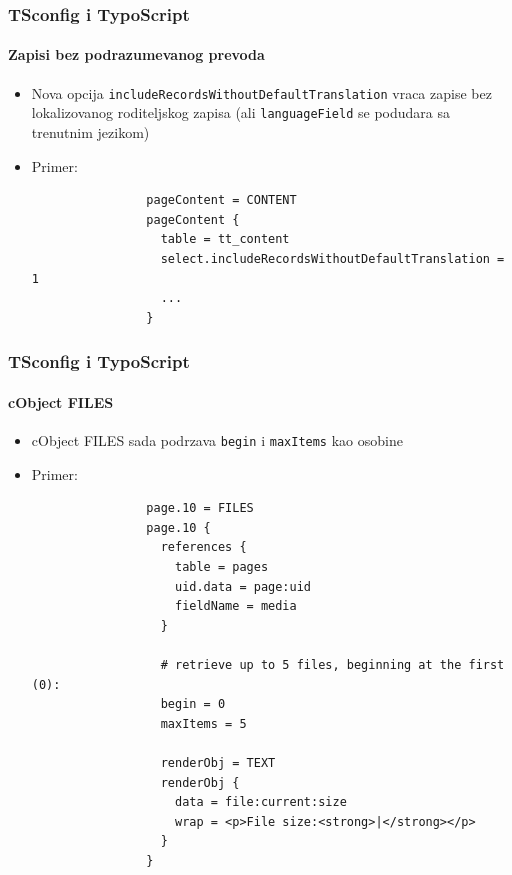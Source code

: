 
\begin{frame}[fragile]
	\frametitle{TSconfig i TypoScript}
	\framesubtitle{Zapisi bez podrazumevanog prevoda}

	\begin{itemize}

		\item Nova opcija \texttt{includeRecordsWithoutDefaultTranslation}
			vraca zapise bez lokalizovanog roditeljskog zapisa\newline
			(ali \texttt{languageField} se podudara sa trenutnim jezikom)

		\item Primer:

			\begin{lstlisting}
				pageContent = CONTENT
				pageContent {
				  table = tt_content
				  select.includeRecordsWithoutDefaultTranslation = 1
				  ...
				}
			\end{lstlisting}

	\end{itemize}

\end{frame}


\begin{frame}[fragile]
	\frametitle{TSconfig i TypoScript}
	\framesubtitle{cObject FILES}

	\begin{itemize}

		\item cObject FILES sada podrzava \texttt{begin} i \texttt{maxItems} kao osobine

		\item Primer:

			\lstset{
				basicstyle=\tiny\ttfamily
			}

			\begin{lstlisting}
				page.10 = FILES
				page.10 {
				  references {
				    table = pages
				    uid.data = page:uid
				    fieldName = media
				  }

				  # retrieve up to 5 files, beginning at the first (0):
				  begin = 0
				  maxItems = 5

				  renderObj = TEXT
				  renderObj {
				    data = file:current:size
				    wrap = <p>File size:<strong>|</strong></p>
				  }
				}
			\end{lstlisting}

	\end{itemize}

\end{frame}

